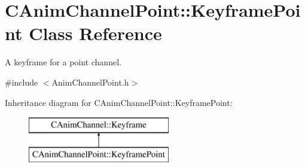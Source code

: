 \hypertarget{class_c_anim_channel_point_1_1_keyframe_point}{\section{C\+Anim\+Channel\+Point\+:\+:Keyframe\+Point Class Reference}
\label{class_c_anim_channel_point_1_1_keyframe_point}
}


A keyframe for a point channel.  




{\ttfamily \#include $<$Anim\+Channel\+Point.\+h$>$}

Inheritance diagram for C\+Anim\+Channel\+Point\+:\+:Keyframe\+Point\+:\begin{figure}[H]
\begin{center}
\leavevmode
\includegraphics[height=2.000000cm]{class_c_anim_channel_point_1_1_keyframe_point}
\end{center}
\end{figure}
